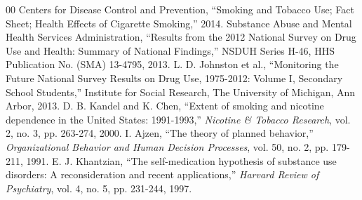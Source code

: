 \documentclass[conference]{IEEEtran}
\begin{document}
\begin{thebibliography}{00}
 Centers for Disease Control and Prevention, ``Smoking and Tobacco Use; Fact Sheet; Health Effects of Cigarette Smoking,'' 2014.
 Substance Abuse and Mental Health Services Administration, ``Results from the 2012 National Survey on Drug Use and Health: Summary of National Findings,'' NSDUH Series H-46, HHS Publication No. (SMA) 13-4795, 2013.
 L. D. Johnston et al., ``Monitoring the Future National Survey Results on Drug Use, 1975-2012: Volume I, Secondary School Students,'' Institute for Social Research, The University of Michigan, Ann Arbor, 2013.
 D. B. Kandel and K. Chen, ``Extent of smoking and nicotine dependence in the United States: 1991-1993,'' \textit{Nicotine \& Tobacco Research}, vol. 2, no. 3, pp. 263-274, 2000.
 I. Ajzen, ``The theory of planned behavior,'' \textit{Organizational Behavior and Human Decision Processes}, vol. 50, no. 2, pp. 179-211, 1991.
 E. J. Khantzian, ``The self-medication hypothesis of substance use disorders: A reconsideration and recent applications,'' \textit{Harvard Review of Psychiatry}, vol. 4, no. 5, pp. 231-244, 1997.
\end{thebibliography}
\end{document}
